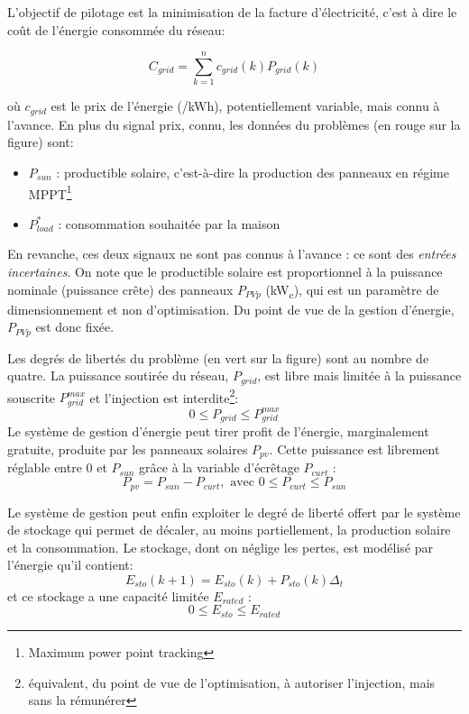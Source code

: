 \documentclass[a4paper,10pt,twocolumn]{article}
\newcommand\sub[1]{\textsubscript{#1}}
\begin{document}
L'objectif de pilotage est la minimisation de la facture d'électricité,
c'est à dire le coût de l'énergie consommée du réseau:

\begin{equation} \label{eq:C_grid}
  C_{grid} = \sum_{k=1}^{n} c_{grid}(k)P_{grid}(k)
\end{equation}

où $c_{grid}$ est le prix de l'énergie (\texteuro/kWh), potentiellement variable,
mais connu à l'avance.
En plus du signal prix, connu, les données du problèmes (en rouge sur la figure) sont:

\begin{itemize}
 \item $P_{sun}$ : productible solaire, c'est-à-dire la production des panneaux en régime
MPPT\footnote{Maximum power point tracking}
 \item $P_{load}^*$ : consommation souhaitée par la maison
\end{itemize}

En revanche, ces deux signaux ne sont pas connus à l'avance :
ce sont des \emph{entrées incertaines}.
On note que le productible solaire est proportionnel
à la puissance nominale (puissance crête) des panneaux $P_{PVp}$ (kW\sub{c}),
qui est un paramètre de dimensionnement et non d'optimisation.
Du point de vue de la gestion d'énergie, $P_{PVp}$ est donc fixée.

Les degrés de libertés du problème (en vert sur la figure) sont au nombre de quatre.
La puissance soutirée du réseau, $P_{grid}$,
est libre mais limitée à la puissance souscrite $P_{grid}^{max}$
et l'injection est interdite\footnote{
équivalent, du point de vue de l'optimisation, à autoriser l'injection, mais sans la rémunérer}:
%
\begin{equation}
  0 \leq P_{grid} \leq P_{grid}^{max}
\end{equation}
%
Le système de gestion d'énergie peut tirer profit de l'énergie, marginalement
gratuite, produite par les panneaux solaires $P_{pv}$.
Cette puissance est librement réglable entre 0 et $P_{sun}$ grâce à la variable
d'écrêtage $P_{curt}$ :
%
\begin{equation}
  P_{pv} = P_{sun} - P_{curt}, \text{ avec } 0 \leq P_{curt} \leq P_{sun}
\end{equation}

Le système de gestion peut enfin exploiter le degré de liberté offert par
le système de stockage qui permet de décaler, au moins partiellement,
la production solaire et la consommation.
Le stockage, dont on néglige les pertes, est modélisé par l'énergie qu'il contient:
%
\begin{equation}
  E_{sto}(k+1) = E_{sto}(k) + P_{sto}(k)\Delta_t
\end{equation}
%
et ce stockage a une capacité limitée $E_{rated}$ :
%
\begin{equation}
  0 \leq E_{sto} \leq E_{rated}
\end{equation}
\end{document}
